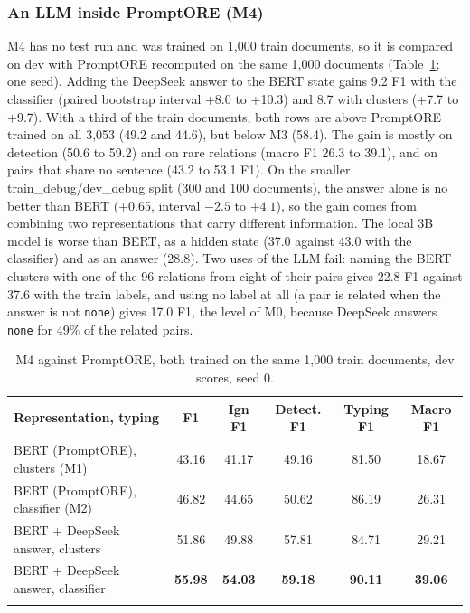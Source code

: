 \documentclass[pdflatex,sn-mathphys-num]{sn-jnl}
\begin{document}
\subsubsection{An LLM inside PromptORE (M4)}

M4 has no test run and was trained on 1,000 train documents, so it is compared on dev with PromptORE recomputed on the same 1,000 documents (Table~\ref{tab:llm}; one seed). Adding the DeepSeek answer to the BERT state gains 9.2 F1 with the classifier (paired bootstrap interval +8.0 to +10.3) and 8.7 with clusters (+7.7 to +9.7). With a third of the train documents, both rows are above PromptORE trained on all 3,053 (49.2 and 44.6), but below M3 (58.4). The gain is mostly on detection (50.6 to 59.2) and on rare relations (macro F1 26.3 to 39.1), and on pairs that share no sentence (43.2 to 53.1 F1). On the smaller train\_debug/dev\_debug split (300 and 100 documents), the answer alone is no better than BERT (+0.65, interval $-2.5$ to $+4.1$), so the gain comes from combining two representations that carry different information. The local 3B model is worse than BERT, as a hidden state (37.0 against 43.0 with the classifier) and as an answer (28.8). Two uses of the LLM fail: naming the BERT clusters with one of the 96 relations from eight of their pairs gives 22.8 F1 against 37.6 with the train labels, and using no label at all (a pair is related when the answer is not \texttt{none}) gives 17.0 F1, the level of M0, because DeepSeek answers \texttt{none} for 49\% of the related pairs.

\begin{table}[htbp]
\caption{M4 against PromptORE, both trained on the same 1,000 train documents, dev scores, seed 0.}\label{tab:llm}
\centering
\begin{tabular}{@{}lccccc@{}}
\toprule
Representation, typing & F1 & Ign F1 & Detect. F1 & Typing F1 & Macro F1 \\
\midrule
BERT (PromptORE), clusters (M1) & 43.16 & 41.17 & 49.16 & 81.50 & 18.67 \\
BERT (PromptORE), classifier (M2) & 46.82 & 44.65 & 50.62 & 86.19 & 26.31 \\
BERT + DeepSeek answer, clusters & 51.86 & 49.88 & 57.81 & 84.71 & 29.21 \\
BERT + DeepSeek answer, classifier & \textbf{55.98} & \textbf{54.03} & \textbf{59.18} & \textbf{90.11} & \textbf{39.06} \\
\botrule
\end{tabular}
\end{table}
\end{document}
